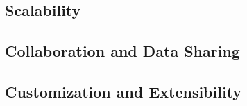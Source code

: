 \subsection{Scalability}

\subsection{Collaboration and Data Sharing}

\subsection{Customization and Extensibility}

